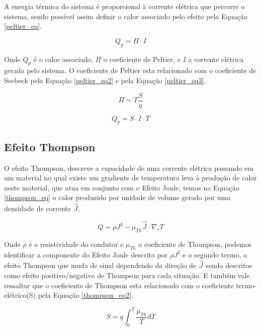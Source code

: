 \documentclass[a4paper,12pt]{article}
\begin{document}
\noindent A energia térmica do sistema é proporcional à corrente elétrica que percorre o sistema, sendo possível assim definir o calor associado pelo efeito pela Equação \ref{peltier_eq}.

\begin{equation}
    Q_{p} = \Pi \cdot I
    \label{peltier_eq}
\end{equation}

\noindent Onde $Q_{p}$ é o calor associado, $\Pi$ o coeficiente de Peltier, e $I$ a corrente elétrica gerada pelo sistema. O coeficiente de Peltier esta relacionado com o coeficiente de Seebeck pela Equação \ref{peltier_eq2} e pela Equação \ref{peltier_eq3}.

\begin{equation}
    \Pi = T \frac{S}{q}
    \label{peltier_eq2}
\end{equation}

\begin{equation}
    Q_{p} = S \cdot I \cdot T
    \label{peltier_eq3}
\end{equation}

\subsection{Efeito Thompson}

O efeito Thompson, descreve a capacidade de uma corrente elétrica passando em um material no qual existe um gradiente de temperatura leva à produção de calor neste material, que atua em conjunto com o Efeito Joule, temos na Equação \ref{thompson_eq} o calor produzido por unidade de volume gerado por uma densidade de corrente $\overrightarrow{J}$.

\begin{equation}
    Q = \rho J^{2} - \mu_{Th}\overrightarrow{J}\cdot \nabla_{r}T
    \label{thompson_eq}
\end{equation}

\noindent Onde $\rho$ é a resistividade do condutor e $\mu_{Th}$ o coeficiente de Thompson, podemos identificar a componente do Efeito Joule descrito por $\rho J^{2}$ e o segundo termo, o efeito Thompson que muda de sinal dependendo da direção de $\overrightarrow{J}$ sendo descritos como efeito positivo/negativo de Thompson para cada situação. E também vale ressaltar que o coeficiente de Thompson esta relacionado com o coeficiente termo-elétrico(S) pela Equação \ref{thompson_eq2}.

\begin{equation}
    S = q \int_{0}^{T} \frac{\mu_{Th}}{T} \mathrm{d}T
    \label{thompson_eq2}
\end{equation}
\end{document}
